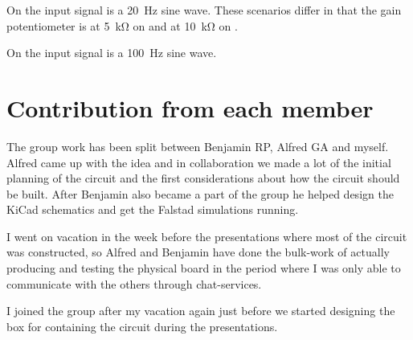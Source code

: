 \documentclass[a4paper]{article}
\begin{document}
  On  the input signal is a \qty{20}{\Hz} sine wave.
  These scenarios differ in that the gain potentiometer is at \qty{5}{\kilo\ohm} on  and at \qty{10}{\kilo\ohm} on .

  On  the input signal is a \qty{100}{\Hz} sine wave.

  \section{Contribution from each member}
  The group work has been split between Benjamin RP, Alfred GA and myself.
  Alfred came up with the idea and in collaboration we made a lot of the initial planning of the circuit and the first considerations about how the circuit should be built.
  After Benjamin also became a part of the group he helped design the KiCad schematics and get the Falstad simulations running.

  I went on vacation in the week before the presentations where most of the circuit was constructed, so Alfred and Benjamin have done the bulk-work of actually producing and testing the physical board in the period where I was only able to communicate with the others through chat-services.

  I joined the group after my vacation again just before we started designing the box for containing the circuit during the presentations.
\end{document}
